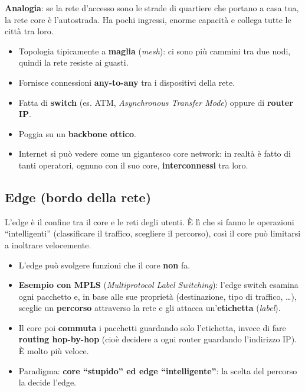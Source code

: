 \begin{nota}

\textbf{Analogia}: se la rete d'accesso sono le strade di quartiere che portano a casa tua, la rete core è l'autostrada. Ha pochi ingressi, enorme capacità e collega tutte le città tra loro.

\end{nota}

\begin{itemize}
\tightlist
\item
  Topologia tipicamente a \textbf{maglia} (\emph{mesh}): ci sono più cammini tra due nodi, quindi la rete resiste ai guasti.
\item
  Fornisce connessioni \textbf{any-to-any} tra i dispositivi della rete.
\item
  Fatta di \textbf{switch} (es. ATM, \emph{Asynchronous Transfer Mode}) oppure di \textbf{router IP}.
\item
  Poggia su un \textbf{backbone ottico}.
\item
  Internet si può vedere come un gigantesco core network: in realtà è fatto di tanti operatori, ognuno con il suo core, \textbf{interconnessi} tra loro.
\end{itemize}

\subsection{Edge (bordo della rete)}

\begin{inbreve}

L'edge è il confine tra il core e le reti degli utenti. È lì che si fanno le operazioni ``intelligenti'' (classificare il traffico, scegliere il percorso), così il core può limitarsi a inoltrare velocemente.

\end{inbreve}

\begin{itemize}
\tightlist
\item
  L'edge può svolgere funzioni che il core \textbf{non} fa.
\item
  \textbf{Esempio con MPLS} (\emph{Multiprotocol Label Switching}): l'edge switch esamina ogni pacchetto e, in base alle sue proprietà (destinazione, tipo di traffico, \ldots), sceglie un \textbf{percorso} attraverso la rete e gli attacca un'\textbf{etichetta} (\emph{label}).
\item
  Il core poi \textbf{commuta} i pacchetti guardando solo l'etichetta, invece di fare \textbf{routing hop-by-hop} (cioè decidere a ogni router guardando l'indirizzo IP). È molto più veloce.
\item
  Paradigma: \textbf{core ``stupido'' ed edge ``intelligente''}: la scelta del percorso la decide l'edge.
\end{itemize}

